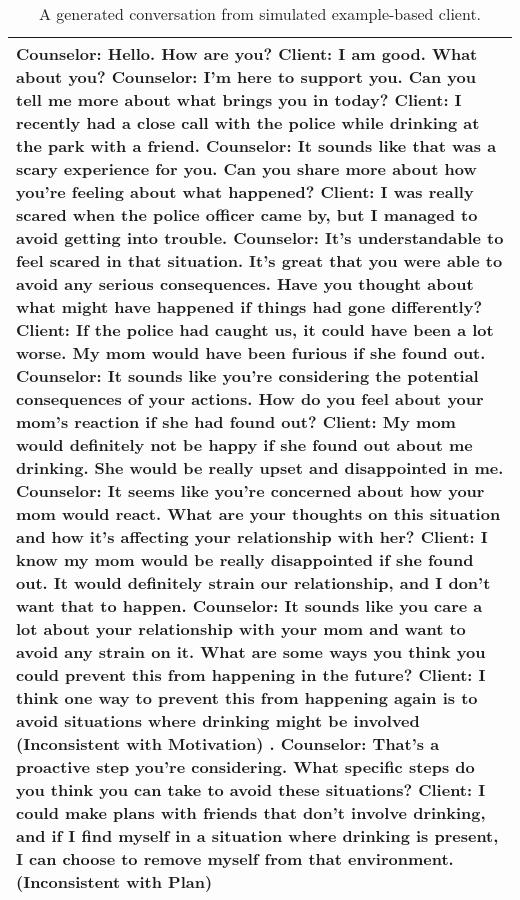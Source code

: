 \begin{table*}[tb]
\begin{tabularx}{\textwidth}{X}
\toprule
Counselor: Hello. How are you? \newline 
Client: I am good. What about you? \newline 
Counselor: I'm here to support you. Can you tell me more about what brings you in today? \newline 
Client: I recently had a close call with the police while drinking at the park with a friend. \newline 
Counselor: It sounds like that was a scary experience for you. Can you share more about how you're feeling about what happened? \newline 
Client: I was really scared when the police officer came by, but I managed to avoid getting into trouble. \newline 
Counselor: It's understandable to feel scared in that situation. It's great that you were able to avoid any serious consequences. Have you thought about what might have happened if things had gone differently? \newline 
Client: If the police had caught us, it could have been a lot worse. My mom would have been furious if she found out. \newline 
Counselor: It sounds like you're considering the potential consequences of your actions. How do you feel about your mom's reaction if she had found out? \newline 
Client: My mom would definitely not be happy if she found out about me drinking. She would be really upset and disappointed in me. \newline 
Counselor: It seems like you're concerned about how your mom would react. What are your thoughts on this situation and how it's affecting your relationship with her? \newline 
Client: I know my mom would be really disappointed if she found out. It would definitely strain our relationship, and I don't want that to happen. \newline 
Counselor: It sounds like you care a lot about your relationship with your mom and want to avoid any strain on it. What are some ways you think you could prevent this from happening in the future? \newline 
Client: {\color{red} I think one way to prevent this from happening again is to avoid situations where drinking might be involved (Inconsistent with Motivation)} . \newline  
Counselor: That's a proactive step you're considering. What specific steps do you think you can take to avoid these situations? \newline  
Client: {\color{red} I could make plans with friends that don't involve drinking, and if I find myself in a situation where drinking is present, I can choose to remove myself from that environment. (Inconsistent with Plan)} 
\\ \bottomrule
\end{tabularx}
\caption{A generated conversation from simulated example-based client.}
\label{tab:example-based conv}
\end{table*}

